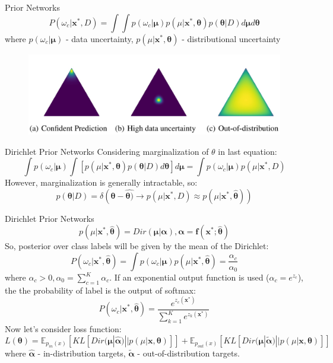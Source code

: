 \documentclass{beamer}
\begin{document}
\begin{frame}{Prior Networks}
    $$P(\omega_c | \mathbf{x}^*, D) = \int \int p(\omega_c | \mathbf{\mu}) p(\mu | \mathbf{x}^*, \mathbf{\theta})p(\mathbf{\theta}|D) d\mathbf{\mu}d\mathbf{\theta}$$
    where $p(\omega_c | \mathbf{\mu})$ - data uncertainty,
    $p(\mu | \mathbf{x}^*, \mathbf{\theta})$ - distributional uncertainty
    \begin{figure}[h]
        \includegraphics[scale=0.25]{examples.jpg}
     \end{figure}
\end{frame}
\begin{frame}{Dirichlet Prior Networks}
    Considering marginalization of $\theta$ in last equation:
    $$\int p(\omega_c | \mathbf{\mu}) \int \left[ p(\mu | \mathbf{x}^*, \mathbf{\theta})p(\mathbf{\theta}|D) d\mathbf{\theta} \right] d\mathbf{\mu} = \int p(\omega_c | \mathbf{\mu}) p(\mu | \mathbf{x}^*, D)$$
    However, marginalization is  generally intractable, so:
    $$p(\mathbf{\theta}| D) = \delta(\mathbf{\theta} - \hat{\mathbf{\theta})} \rightarrow p(\mu | \mathbf{x}^*, D) \approx p(\mu | \mathbf{x}^*, \hat{\mathbf{\theta}}))$$
\end{frame}
\begin{frame}{Dirichlet Prior Networks}
    $$p(\mu | \mathbf{x}^*, \hat{\mathbf{\theta}}) = Dir(\mathbf{\mu} | \mathbf{\alpha}), \mathbf{\alpha} = \mathbf{f}(\mathbf{x}^*; \hat{\mathbf{\theta}})$$
    So, posterior over class labels will be given by the mean of the Dirichlet:
    $$P(\omega_c | \mathbf{x}^*, \hat{\mathbf{\theta}}) = \int p(\omega_c | \mathbf{\mu}) p(\mu | \mathbf{x}^*, \hat{\mathbf{\theta}}) = \frac{\alpha_c}{\alpha_0}$$
    where $\alpha_c > 0, \alpha_0 = \sum_{c=1}^K\alpha_c$.\newline
    If an exponential output function is used ($\alpha_c = e^{z_c}$), the the probability of label is the output of softmax:
    $$P(\omega_c | \mathbf{x}^*, \hat{\mathbf{\theta}}) = \frac{e^{z_c(\mathbf{x}^*)}}{\sum_{k=1}^Ke^{z_k(\mathbf{x}^*)}}$$
    Now let's consider loss function:
    $$L(\mathbf{\theta}) = \mathbb{E}_{p_{in}(x)}[KL[Dir(\mathbf{\mu} | \mathbf{\hat{\alpha}}) || p(\mu | \mathbf{x}, \mathbf{\theta})]] + \mathbb{E}_{p_{out}(x)}[KL[Dir(\mathbf{\mu} | \mathbf{\tilde{\alpha}}) || p(\mu | \mathbf{x}, \mathbf{\theta})]]$$
    where $\mathbf{\hat{\alpha}}$ - in-distribution targets,
    $\mathbf{\tilde{\alpha}}$ - out-of-distribution targets.
\end{frame}
\end{document}
